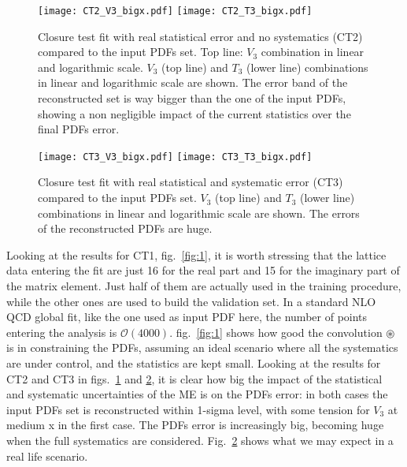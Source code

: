 \begin{figure}[h!]
    \begin{center}
	\texttt{[image: CT2\_V3\_bigx.pdf]}  
	\texttt{[image: CT2\_T3\_bigx.pdf]}  
	\caption{Closure test fit with real statistical error and no systematics (CT2) compared to the input PDFs set. 
		Top line: $V_3$ combination in linear and logarithmic scale.
		$V_3$ (top line) and $T_3$ (lower line) combinations in linear and logarithmic scale are shown.
		The error band of the reconstructed set is way bigger than the one of the input PDFs,
	showing a non negligible impact of the current statistics over the final PDFs error.}
    \label{fig:2}
    \end{center}
\end{figure}

\begin{figure}[h!]
    \begin{center}
	\texttt{[image: CT3\_V3\_bigx.pdf]}  
	\texttt{[image: CT3\_T3\_bigx.pdf]}  
	\caption{Closure test fit with real statistical and systematic error (CT3) compared to the input PDFs set. 
                 $V_3$ (top line) and $T_3$ (lower line) combinations in linear and logarithmic scale are shown.
                 The errors of the reconstructed PDFs are huge.}
    \label{fig:3}
    \end{center}
\end{figure}
\noindent
Looking at the results for CT1, fig.~\ref{fig:1}, it is worth stressing that the
lattice data entering the fit are just 16 for the real part and 15 for the
imaginary part of the matrix element. Just half of them are actually used in the
training procedure, while the other ones are used to build the validation set.
In a standard NLO QCD global fit, like the one used as input PDF here, the
number of points entering the analysis is $\mathcal{O}\left(4000\right)$. 
fig.~\ref{fig:1} shows how good the convolution $\circledast$
is in constraining the PDFs, assuming an ideal scenario where all the
systematics are under control, and the statistics are kept small. Looking at the
results for CT2 and CT3 in figs.~\ref{fig:2} and \ref{fig:3}, it is clear how
big the impact of the statistical and systematic uncertainties of the ME is on
the PDFs error: in both cases the input PDFs set is reconstructed within 1-sigma
level, with some tension for $V_3$ at medium x in the first case. The PDFs error
is increasingly big, becoming huge when the full systematics are considered.
Fig.~\ref{fig:3} shows what we may expect in a real life scenario.

